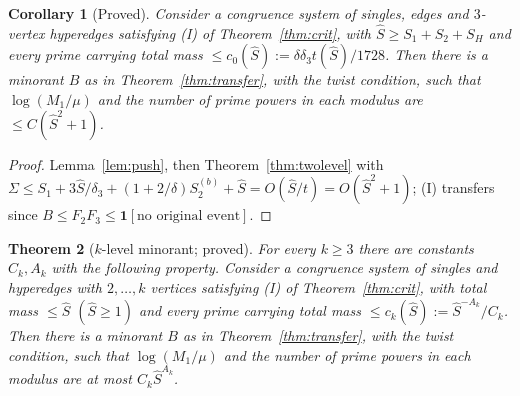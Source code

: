 \documentclass[11pt,reqno]{amsart}
\newtheorem{theorem}{Theorem}[section]
\newtheorem{corollary}[theorem]{Corollary}
\theoremstyle{definition}
\begin{document}
\begin{corollary}[Proved]\label{cor:crit3}
Consider a congruence system of singles, edges and $3$-vertex hyperedges
satisfying \textup{(I)} of Theorem~\ref{thm:crit}, with
$\hat S\ge S_1+S_2+S_H$ and every prime carrying total mass
$\le c_0(\hat S):=\delta\delta_3t(\hat S)/1728$.  Then there is a minorant $B$
as in Theorem~\ref{thm:transfer}, with the twist condition, such that
$\log(M_1/\mu)$ and the number of prime powers in each modulus are
$\le C(\hat S^2+1)$.
\end{corollary}

\begin{proof}
Lemma~\ref{lem:push}, then Theorem~\ref{thm:twolevel} with
$\Sigma\le S_1+3\hat S/\delta_3+(1+2/\delta)S_2^{(b)}+\hat S=O(\hat S/t)=O(\hat S^2+1)$;
(I) transfers since $B\le F_2F_3\le\mathbf 1[\text{no original event}]$.
\end{proof}

\begin{theorem}[$k$-level minorant; proved]\label{thm:klevel}
For every $k\ge3$ there are constants $C_k,A_k$ with the following property.
Consider a congruence system of singles and hyperedges with $2,\dots,k$
vertices satisfying \textup{(I)} of Theorem~\ref{thm:crit}, with total mass
$\le\hat S$ $(\hat S\ge1)$ and every prime carrying total mass
$\le c_k(\hat S):=\hat S^{-A_k}/C_k$.  Then there is a minorant $B$ as in
Theorem~\ref{thm:transfer}, with the twist condition, such that
$\log(M_1/\mu)$ and the number of prime powers in each modulus are at most
$C_k\hat S^{A_k}$.
\end{theorem}
\end{document}
